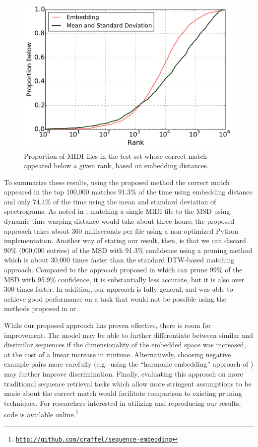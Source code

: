 \documentclass{article}
\begin{document}
\begin{figure}[t]
  \centering
  \includegraphics[width=\columnwidth]{ranks.pdf}
  \caption{Proportion of MIDI files in the test set whose correct match appeared below a given rank, based on embedding distances.}
  \label{fig:ranks}
\end{figure}

To summarize these results, using the proposed method the correct match appeared in the top 100,000 matches 91.3\% of the time using embedding distance and only 74.4\% of the time using the mean and standard deviation of spectrograms.
As noted in \cite{raffel2015large}, matching a single MIDI file to the MSD using dynamic time warping distance would take about three hours; the proposed approach takes about 360 milliseconds per file using a non-optimized Python implementation.
Another way of stating our result, then, is that we can discard 90\% (900,000 entries) of the MSD with 91.3\% confidence using a pruning method which is about 30,000 times faster than the standard DTW-based matching approach.
Compared to the approach proposed in \cite{raffel2015large} which can prune 99\% of the MSD with 95.9\% confidence, it is substantially less accurate, but it is also over 300 times faster.
In addition, our approach is fully general, and was able to achieve good performance on a task that would not be possible using the methods proposed in \cite{rakthanmanon2012searching} or \cite{papapetrou2011embedding}.

While our proposed approach has proven effective, there is room for improvement.
The model may be able to further differentiate between similar and dissimilar sequences if the dimensionality of the embedded space was increased, at the cost of a linear increase in runtime.
Alternatively, choosing negative example pairs more carefully (e.g.\ using the ``harmonic embedding'' approach of \cite{schroff2015facenet}) may further improve discrimination.
Finally, evaluating this approach on more traditional sequence retrieval tasks which allow more stringent assumptions to be made about the correct match would facilitate comparison to existing pruning techniques.
For researchers interested in utilizing and reproducing our results, code is available online.\footnote{\href{http://github.com/craffel/sequence-embedding}{\texttt{http://github.com/craffel/sequence-embedding}}}



\end{document}
